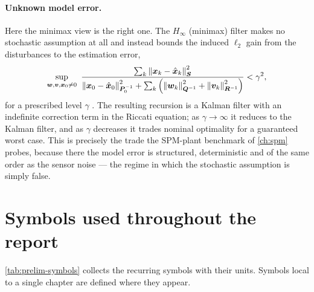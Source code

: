 \paragraph{Unknown model error.} Here the minimax view is the right one. The $H_\infty$
(minimax) filter makes no stochastic assumption at all and instead bounds the induced
$\ell_2$ gain from the disturbances to the estimation error,
\begin{equation}
\sup_{\bm{w},\bm{v},\bm{x}_0\ne 0}\
\frac{\sum_k \left\lVert \bm{x}_k-\hat{\bm{x}}_k \right\rVert^2_{\bm{S}}}
     {\left\lVert \bm{x}_0-\hat{\bm{x}}_0 \right\rVert^2_{\bm{P}_0^{-1}} + \sum_k\left(\left\lVert \bm{w}_k \right\rVert^2_{\bm{Q}^{-1}}+\left\lVert \bm{v}_k \right\rVert^2_{\bm{R}^{-1}}\right)}
 < \gamma^2 ,
\label{eq:prelim-hinf}
\end{equation}
for a prescribed level $\gamma$ \cite{shen1997hinf,hassibi1996hinf,simon2006}. The resulting
recursion is a Kalman filter with an indefinite correction term in the Riccati equation; as
$\gamma\to\infty$ it reduces to the Kalman filter, and as $\gamma$ decreases it trades nominal
optimality for a guaranteed worst case. This is precisely the trade the SPM-plant benchmark of
\cref{ch:spm} probes, because there the model error is structured, deterministic and of the same
order as the sensor noise --- the regime in which the stochastic assumption is simply false.

\section{Symbols used throughout the report}
\label{sec:prelim-symbols}

\cref{tab:prelim-symbols} collects the recurring symbols with their units. Symbols local to a
single chapter are defined where they appear.

